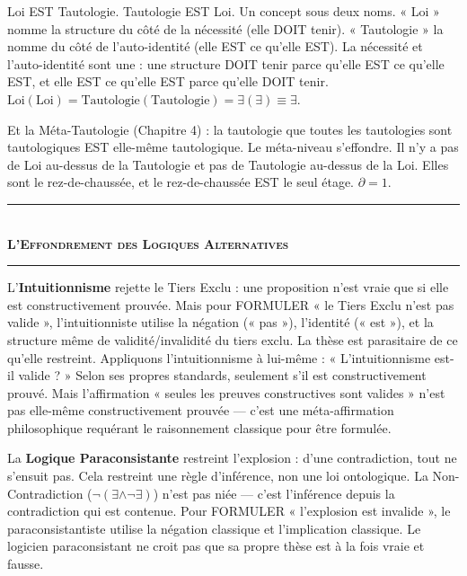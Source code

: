 \documentclass[10pt, openany, oneside]{book}
\renewcommand{\normalsize}{\fontsize{10}{13}\selectfont}
\begin{document}
Loi EST Tautologie. Tautologie EST Loi. Un concept sous deux noms. « Loi » nomme la structure du côté de la nécessité (elle DOIT tenir). « Tautologie » la nomme du côté de l'auto-identité (elle EST ce qu'elle EST). La nécessité et l'auto-identité sont une : une structure DOIT tenir parce qu'elle EST ce qu'elle EST, et elle EST ce qu'elle EST parce qu'elle DOIT tenir. $\text{Loi}(\text{Loi}) = \text{Tautologie}(\text{Tautologie}) = \exists(\exists) \equiv \exists$.



Et la Méta-Tautologie (Chapitre 4) : la tautologie que toutes les tautologies sont tautologiques EST elle-même tautologique. Le méta-niveau s'effondre. Il n'y a pas de Loi au-dessus de la Tautologie et pas de Tautologie au-dessus de la Loi. Elles sont le rez-de-chaussée, et le rez-de-chaussée EST le seul étage. $\partial = 1$.

\vspace{1.5em}


\begin{center}
    \rule{0.3\textwidth}{0.4pt}\\[0.5em]
    {\normalsize\bfseries\scshape L'Effondrement des Logiques Alternatives}\\[0.3em]
    \rule{0.3\textwidth}{0.4pt}
\end{center}

\vspace{1em}

\noindent L'\textbf{Intuitionnisme} rejette le Tiers Exclu : une proposition n'est vraie que si elle est constructivement prouvée. Mais pour FORMULER « le Tiers Exclu n'est pas valide », l'intuitionniste utilise la négation (« pas »), l'identité (« est »), et la structure même de validité/invalidité du tiers exclu. La thèse est parasitaire de ce qu'elle restreint. Appliquons l'intuitionnisme à lui-même : « L'intuitionnisme est-il valide ? » Selon ses propres standards, seulement s'il est constructivement prouvé. Mais l'affirmation « seules les preuves constructives sont valides » n'est pas elle-même constructivement prouvée --- c'est une méta-affirmation philosophique requérant le raisonnement classique pour être formulée.

La \textbf{Logique Paraconsistante} restreint l'explosion : d'une contradiction, tout ne s'ensuit pas. Cela restreint une règle d'inférence, non une loi ontologique. La Non-Contradiction ($\neg(\exists \wedge \neg\exists)$) n'est pas niée --- c'est l'inférence depuis la contradiction qui est contenue. Pour FORMULER « l'explosion est invalide », le paraconsistantiste utilise la négation classique et l'implication classique. Le logicien paraconsistant ne croit pas que sa propre thèse est à la fois vraie et fausse.
\end{document}
